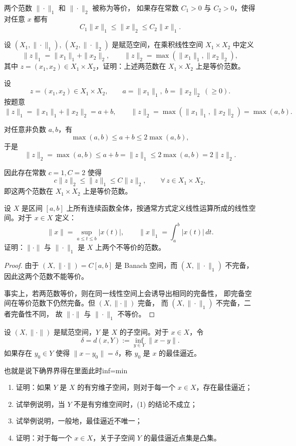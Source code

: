 \begin{dxtips}
   两个范数 $\|\cdot\|_1$ 和 $\|\cdot\|_2$ 被称为等价，
如果存在常数 $C_1>0$ 与 $C_2>0$，使得对任意 $x$ 都有
\[
C_1\|x\|_1 \le \|x\|_2 \le C_2\|x\|_1 .
\]
\end{dxtips}
\begin{homework}[13]
设 $(X_1, \|\cdot\|_1)$, $(X_2, \|\cdot\|_2)$ 是赋范空间，在乘积线性空间 $X_1 \times X_2$ 中定义
\[
\|z\|_1 = \|x_1\|_1 + \|x_2\|_2,\qquad
\|z\|_2 = \max(\|x_1\|_1, \|x_2\|_2),
\]
其中 $z = (x_1, x_2) \in X_1 \times X_2$，证明：上述两范数在 $X_1 \times X_2$ 上是等价范数。
\end{homework}
\begin{solution}
设
\[
z=(x_1,x_2)\in X_1\times X_2,\qquad 
a=\|x_1\|_1,\; b=\|x_2\|_2\ (\ge0).
\]
按题意
\[
\|z\|_1 = \|x_1\|_1+\|x_2\|_2 = a+b,\qquad
\|z\|_2 = \max(\|x_1\|_1,\|x_2\|_2)=\max(a,b).
\]

对任意非负数 $a,b$，有
\[
\max(a,b)\le a+b\le 2\max(a,b),
\]
于是
\[
\|z\|_2 = \max(a,b)\le a+b=\|z\|_1\le 2\max(a,b)=2\|z\|_2.
\]

因此存在常数 $c=1,C=2$ 使得
\[
c\|z\|_2\le\|z\|_1\le C\|z\|_2,\qquad \forall\,z\in X_1\times X_2,
\]
即这两个范数在 $X_1\times X_2$ 上是等价范数。
\end{solution}
\begin{homework}[14]
设 $X$ 是区间 $[a,b]$ 上所有连续函数全体，按通常方式定义线性运算所成的线性空间。对于 $x \in X$ 定义：
\[
\|x\| = \sup_{a \le t \le b} |x(t)|,\qquad
\|x\|_1 = \int_a^b |x(t)|\,dt.
\]
证明：$\|\cdot\|$ 与 $\|\cdot\|_1$ 是 $X$ 上两个不等价的范数。
\end{homework}
\begin{proof}
由于 $(X,\|\cdot\|)=C[a,b]$ 是 Banach 空间，而 $(X,\|\cdot\|_1)$ 不完备，
因此这两个范数不能等价。

事实上，若两范数等价，则在同一线性空间上会诱导出相同的完备性，
即完备空间在等价范数下仍然完备。但 $(X,\|\cdot\|)$ 完备，
而 $(X,\|\cdot\|_1)$ 不完备，二者完备性不同，
故 $\|\cdot\|$ 与 $\|\cdot\|_1$ 不等价。
\end{proof}
\begin{homework}[16]
设 $(X,\|\cdot\|)$ 是赋范空间，$Y$ 是 $X$ 的子空间。对于 $x \in X$，令
\[
\delta = d(x,Y) := \inf_{y \in Y} \|x - y\|.
\]
如果存在 $y_0 \in Y$ 使得 $\|x - y_0\| = \delta$，称 $y_0$ 是 $x$ 的最佳逼近。
\begin{dxtips}
    也就是说下确界界得在里面此时inf=min
\end{dxtips}
\begin{enumerate}[(1)]
  \item 证明：如果 $Y$ 是 $X$ 的有穷维子空间，则对于每一个 $x \in X$，存在最佳逼近；
  \item 试举例说明，当 $Y$ 不是有穷维空间时，(1) 的结论不成立；
  \item 试举例说明，一般地，最佳逼近不唯一；
  \item 证明：对于每一个 $x \in X$，关于子空间 $Y$ 的最佳逼近点集是凸集。
\end{enumerate}
\end{homework}

